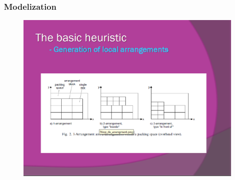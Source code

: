 \documentclass{beamer}
\begin{document}
\begin{frame}
\frametitle{Modelization }
\begin{figure}[!th]
\begin{center}
\includegraphics[width=1\textwidth]{img/picn6.eps}
\end{center}
\end{figure}
\end{frame}
\end{document}
